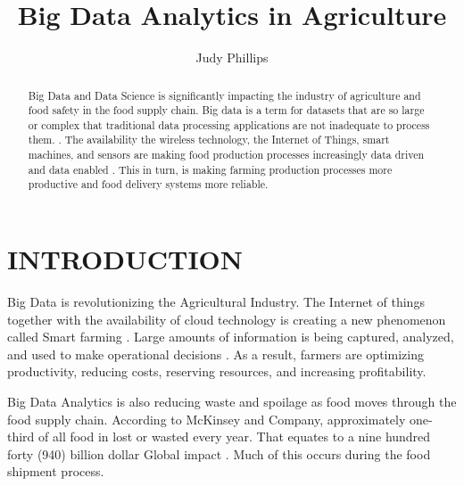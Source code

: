 \documentclass[sigconf]{acmart}
\begin{document}
\title{Big Data Analytics in Agriculture}


\author{Judy Phillips}

\renewcommand{\shortauthors}{B. Trovato et al.}


\begin{abstract}
Big Data and Data Science is significantly impacting the industry of agriculture and food safety in the food supply chain. Big data is a term for datasets that are so large or complex that traditional data processing applications are not inadequate to process them. \cite{Wolfert}.  The availability the wireless technology, the Internet of Things, smart machines, and sensors are making food production processes increasingly data driven and data enabled \cite{Wolfert}. This in turn, is making farming production processes more productive and food delivery systems more reliable. 
\end{abstract}



\maketitle

\section{INTRODUCTION}

Big Data is revolutionizing the Agricultural Industry. The Internet of things together with the availability of cloud technology is creating a new phenomenon called Smart farming \cite{Wolfert}. Large amounts of information is being captured, analyzed, and used to make operational decisions  \cite{DevEcon}.  As a result, farmers are optimizing productivity, reducing costs, reserving resources, and increasing profitability. 

Big Data Analytics is also reducing waste and spoilage as food moves through the food supply chain.  According to McKinsey and Company, approximately one-third of all food in lost or wasted every year.  That equates to a nine hundred forty (940) billion dollar Global impact \cite{www-google-bigdatatech}.  Much of this occurs during the food shipment process.  
\end{document}
